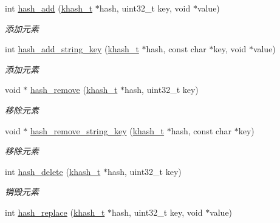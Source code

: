 \begin{DoxyCompactItemize}
int \hyperlink{a00064_aff2221d277f95457bc2fdf4215bd196e_aff2221d277f95457bc2fdf4215bd196e}{hash\+\_\+add} (\hyperlink{a00053_aa242a9a673d8677076543d5768798f2c_aa242a9a673d8677076543d5768798f2c}{khash\+\_\+t} $\ast$hash, uint32\+\_\+t key, void $\ast$value)
\begin{DoxyCompactList}\small\item\em 添加元素 \end{DoxyCompactList}\item 
int \hyperlink{a00064_a9fd87e76680bcfb665a95535746c166d_a9fd87e76680bcfb665a95535746c166d}{hash\+\_\+add\+\_\+string\+\_\+key} (\hyperlink{a00053_aa242a9a673d8677076543d5768798f2c_aa242a9a673d8677076543d5768798f2c}{khash\+\_\+t} $\ast$hash, const char $\ast$key, void $\ast$value)
\begin{DoxyCompactList}\small\item\em 添加元素 \end{DoxyCompactList}\item 
void $\ast$ \hyperlink{a00064_a544058a99adc9150c308b0bf4a98cf07_a544058a99adc9150c308b0bf4a98cf07}{hash\+\_\+remove} (\hyperlink{a00053_aa242a9a673d8677076543d5768798f2c_aa242a9a673d8677076543d5768798f2c}{khash\+\_\+t} $\ast$hash, uint32\+\_\+t key)
\begin{DoxyCompactList}\small\item\em 移除元素 \end{DoxyCompactList}\item 
void $\ast$ \hyperlink{a00064_a319fdee63a99809c36438ea7200b0785_a319fdee63a99809c36438ea7200b0785}{hash\+\_\+remove\+\_\+string\+\_\+key} (\hyperlink{a00053_aa242a9a673d8677076543d5768798f2c_aa242a9a673d8677076543d5768798f2c}{khash\+\_\+t} $\ast$hash, const char $\ast$key)
\begin{DoxyCompactList}\small\item\em 移除元素 \end{DoxyCompactList}\item 
int \hyperlink{a00064_ad8391c6d9c70f03fde25994da030b0c5_ad8391c6d9c70f03fde25994da030b0c5}{hash\+\_\+delete} (\hyperlink{a00053_aa242a9a673d8677076543d5768798f2c_aa242a9a673d8677076543d5768798f2c}{khash\+\_\+t} $\ast$hash, uint32\+\_\+t key)
\begin{DoxyCompactList}\small\item\em 销毁元素 \end{DoxyCompactList}\item 
int \hyperlink{a00064_aa82d295b5298fc0f2e46d583ee83731b_aa82d295b5298fc0f2e46d583ee83731b}{hash\+\_\+replace} (\hyperlink{a00053_aa242a9a673d8677076543d5768798f2c_aa242a9a673d8677076543d5768798f2c}{khash\+\_\+t} $\ast$hash, uint32\+\_\+t key, void $\ast$value)

\end{DoxyCompactItemize}
